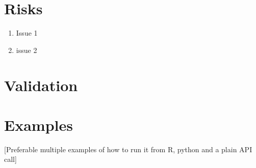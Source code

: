\documentclass[11pt]{vantage6} %
\begin{document}

\section{Risks}

\begin{enumerate}
\item Issue 1
\item issue 2
\end{enumerate}


\section{Validation}



\section{Examples}
[Preferable multiple examples of how to run it from R, python and a plain API call]








\end{document}
